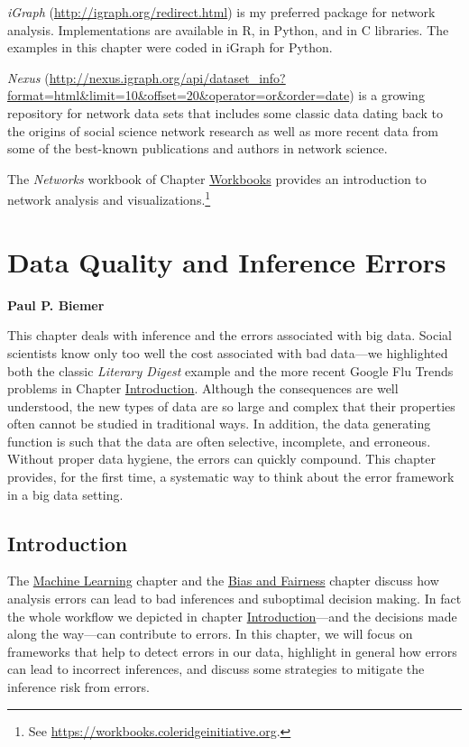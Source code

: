\documentclass[]{krantz}
\begin{document}
\emph{iGraph} (\url{http://igraph.org/redirect.html}) is my preferred
package for network analysis. Implementations are available in R, in
Python, and in C libraries. The examples in this chapter were coded in
iGraph for Python.

\emph{Nexus}
(\url{http://nexus.igraph.org/api/dataset_info?format=html\&limit=10\&offset=20\&operator=or\&order=date})
is a growing repository for network data sets that includes some classic
data dating back to the origins of social science network research as
well as more recent data from some of the best-known publications and
authors in network science.

The \emph{Networks} workbook of Chapter
\protect\hyperlink{chap:workbooks}{Workbooks} provides an introduction
to network analysis and visualizations.\footnote{See
  \url{https://workbooks.coleridgeinitiative.org}.}

\hypertarget{chap:errors}{\chapter{Data Quality and Inference
Errors}\label{chap:errors}}

\textbf{Paul P. Biemer}

This chapter deals with inference and the errors associated with big
data. Social scientists know only too well the cost associated with bad
data---we highlighted both the classic \emph{Literary Digest} example
and the more recent Google Flu Trends problems in Chapter
\protect\hyperlink{chap:intro}{Introduction}. Although the consequences
are well understood, the new types of data are so large and complex that
their properties often cannot be studied in traditional ways. In
addition, the data generating function is such that the data are often
selective, incomplete, and erroneous. Without proper data hygiene, the
errors can quickly compound. This chapter provides, for the first time,
a systematic way to think about the error framework in a big data
setting.

\hypertarget{sec:10-1}{\section{Introduction}\label{sec:10-1}}

The \protect\hyperlink{chap:ml}{Machine Learning} chapter and the
\protect\hyperlink{chap:bias}{Bias and Fairness} chapter discuss how
analysis errors can lead to bad inferences and suboptimal decision
making. In fact the whole workflow we depicted in chapter
\protect\hyperlink{chap:intro}{Introduction}---and the decisions made
along the way---can contribute to errors. In this chapter, we will focus
on frameworks that help to detect errors in our data, highlight in
general how errors can lead to incorrect inferences, and discuss some
strategies to mitigate the inference risk from errors.
\end{document}
